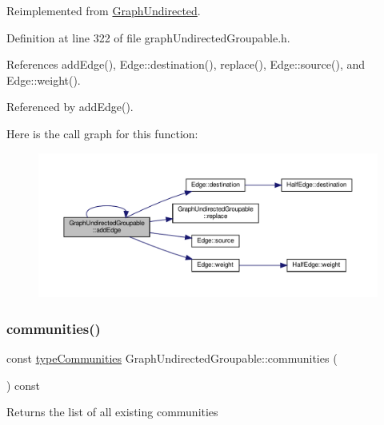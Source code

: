 Reimplemented from \hyperlink{classGraphUndirected_a366c8b7dbf1cbfe408d5399ad64494dc}{Graph\+Undirected}.



Definition at line 322 of file graph\+Undirected\+Groupable.\+h.



References add\+Edge(), Edge\+::destination(), replace(), Edge\+::source(), and Edge\+::weight().



Referenced by add\+Edge().

Here is the call graph for this function\+:
\nopagebreak
\begin{figure}[H]
\begin{center}
\leavevmode
\includegraphics[width=350pt]{classGraphUndirectedGroupable_a2efe963916349ac6615721ab85a93ceb_cgraph}
\end{center}
\end{figure}
\mbox{\label{classGraphUndirectedGroupable_a57f8ea4cff0d83b80cca2dc8e8e19ff6}} 
\subsubsection{\texorpdfstring{communities()}{communities()}}
{\footnotesize\ttfamily const \hyperlink{graphUndirectedGroupable_8h_ab79c7252155ca17cb49aa0b1fea30116}{type\+Communities} Graph\+Undirected\+Groupable\+::communities (\begin{DoxyParamCaption}{ }\end{DoxyParamCaption}) const\hspace{0.3cm}{\ttfamily [inline]}}

\begin{DoxyReturn}{Returns}
the list of all existing communities 
\end{DoxyReturn}


